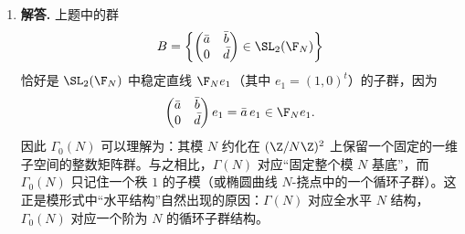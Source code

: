 \begin{enumerate}[label=\textbf{\arabic*.}, leftmargin=*, itemsep=1em]
\item \textbf{解答.} 上题中的群
\[
B=\left\{
\begin{pmatrix}\bar a&\bar b\\ 0&\bar d\end{pmatrix}\in \SL_2(\F_N)
\right\}
\]
恰好是 $\SL_2(\F_N)$ 中稳定直线 $\F_N e_1$（其中 $e_1=(1,0)^t$）的子群，因为
\[
\begin{pmatrix}\bar a&\bar b\\ 0&\bar d\end{pmatrix}e_1=\bar a\,e_1\in \F_N e_1.
\]
因此 $\Gamma_0(N)$ 可以理解为：其模 $N$ 约化在 $(\Z/N\Z)^2$ 上保留一个固定的一维子空间的整数矩阵群。与之相比，$\Gamma(N)$ 对应“固定整个模 $N$ 基底”，而 $\Gamma_0(N)$ 只记住一个秩 $1$ 的子模（或椭圆曲线 $N$-挠点中的一个循环子群）。这正是模形式中“水平结构”自然出现的原因：$\Gamma(N)$ 对应全水平 $N$ 结构，$\Gamma_0(N)$ 对应一个阶为 $N$ 的循环子群结构。
\end{enumerate}



